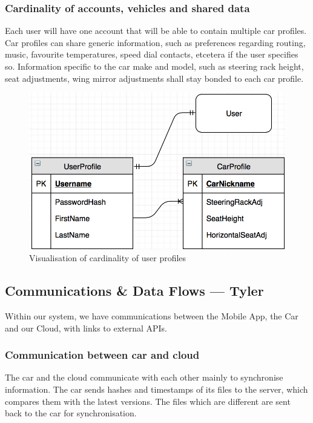 \documentclass{article}
\begin{document}
\subsubsection{Cardinality of accounts, vehicles and shared data}
Each user will have one account that will be able to contain multiple car profiles. Car profiles can share generic information, such as preferences regarding routing, music, favourite temperatures, speed dial contacts, etcetera if the user specifies so. Information specific to the car make and model, such as steering rack height, seat adjustments, wing mirror adjustments shall stay bonded to each car profile.
\begin{figure}[H]
  \centering
  \includegraphics[scale=0.7]{profile-cardinality}
  \caption{Visualisation of cardinality of user profiles}\label{cardinality}
\end{figure}


\subsection{Communications \& Data Flows --- Tyler}\label{ssec:communications-data}
Within our system, we have communications between the Mobile App, the Car and our Cloud, with links to external APIs.

\subsubsection{Communication between car and cloud}
The car and the cloud communicate with each other mainly to synchronise information. The car sends hashes and timestamps of its files to the server, which compares them with the latest versions. The files which are different are sent back to the car for synchronisation.
\end{document}
